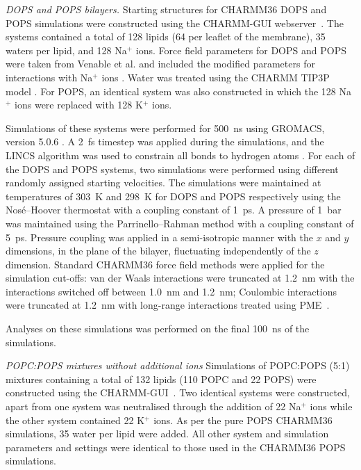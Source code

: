 \documentclass[journal=jpcbfk,manuscript=article]{achemso}
\begin{document}
\noindent
{\it DOPS and POPS bilayers.}
Starting structures for CHARMM36 DOPS and POPS simulations were constructed using the CHARMM-GUI webserver~\cite{lee16,jo18}.
The systems contained a total of 128 lipids (64 per leaflet of the membrane), 35 waters per lipid, and 128 Na$^+$ ions.
Force field parameters for DOPS and POPS were taken from Venable et al. and included the modified parameters for interactions
with Na$^+$ ions \cite{venable13}. Water was treated using the CHARMM TIP3P model \cite{durell94,eyal96}.
For POPS, an identical system was also constructed in which the 128 Na$^+$ ions were replaced with 128 K$^+$ ions.

Simulations of these systems were performed for 500~ns using GROMACS, version 5.0.6 \cite{abraham2015gromacs}.
A 2~fs timestep was applied during the simulations, and the LINCS algorithm was used to constrain all bonds to hydrogen atoms \cite{hess97,hess07}.
For each of the DOPS and POPS systems, two simulations were performed using different randomly assigned starting velocities.
The simulations were maintained at temperatures of 303~K and 298~K for DOPS and POPS respectively using the Nos\'{e}--Hoover thermostat \cite{nose84,hoover85}
with a coupling constant of 1~ps. A pressure of 1~bar was maintained using the Parrinello--Rahman \cite{parrinello81} method with a coupling constant of 5~ps.
Pressure coupling was applied in a semi-isotropic manner with the $x$ and $y$ dimensions, in the plane of the bilayer, fluctuating independently of the $z$ dimension.
Standard CHARMM36 force field methods were applied for the simulation cut-offs: van der Waals interactions were truncated at 1.2~nm with the interactions
switched off between 1.0~nm and 1.2~nm; Coulombic interactions were truncated at 1.2~nm with long-range interactions treated using PME~\cite{darden93,essman95}.

Analyses on these simulations was performed on the final 100~ns of the simulations.



\noindent
{\it POPC:POPS mixtures without additional ions}
Simulations of POPC:POPS (5:1) mixtures containing a total of 132 lipids (110 POPC and 22 POPS) were constructed using the CHARMM-GUI~\cite{lee16,jo18}.
Two identical systems were constructed, apart from one system was neutralised through the addition of 22 Na$^+$ ions while the other system
contained 22 K$^+$ ions. As per the pure POPS CHARMM36 simulations, 35 water per lipid were added. All other system and simulation parameters
and settings were identical to those used in the CHARMM36 POPS simulations.
\end{document}
